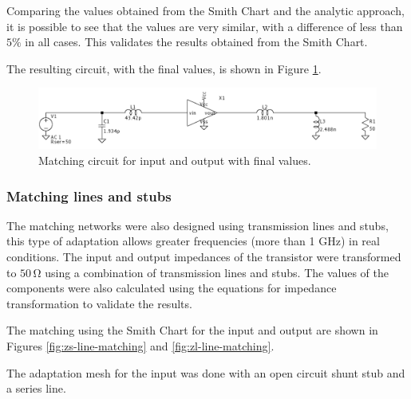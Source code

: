 Comparing the values obtained from the Smith Chart and the analytic approach, it is possible to see that the values are very similar, with a difference of less than $5\%$ in all cases. This validates the results obtained from the Smith Chart.

The resulting circuit, with the final values, is shown in Figure \ref{fig:MatchingCircuit}.
\begin{figure}[H]
    \centering
    \includegraphics[width=1\textwidth]{Images/LC_matching-circuit.png}
    \caption{Matching circuit for input and output with final values.}
    \label{fig:MatchingCircuit}
\end{figure}

\subsubsection{Matching lines and stubs}
The matching networks were also designed using transmission lines and stubs, this type of adaptation allows greater frequencies (more than 1 \si{\giga \hertz}) in real conditions. The input and output impedances of the transistor were transformed to $50\,\si{\ohm}$ using a combination of transmission lines and stubs. The values of the components were also calculated using the equations for impedance transformation to validate the results.

The matching using the Smith Chart for the input and output are shown in Figures \ref{fig:zs-line-matching} and \ref{fig:zl-line-matching}.


The adaptation mesh for the input was done with an open circuit shunt stub and a series line. 


